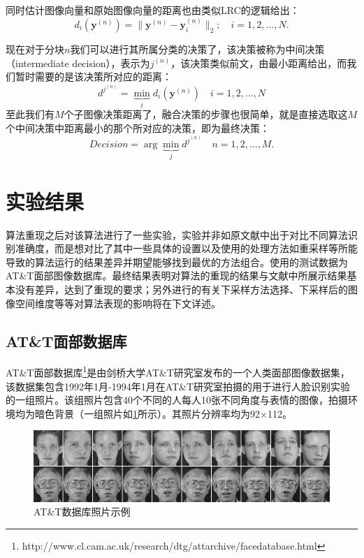 \documentclass[UTF8]{ctexart}
\begin{document}
\par
同时估计图像向量和原始图像向量的距离也由类似LRC的逻辑给出：
\begin{equation}
    d_i(\mathbf{y}^{(n)})=\|\mathbf{y}^{(n)}-\mathbf{y}^{(n)}_i\|_2;\quad i=1,2,\dots,N.
\end{equation}
\par
现在对于分块\(n\)我们可以进行其所属分类的决策了，该决策被称为中间决策（intermediate decision），表示为\(j^{(n)}\)，该决策类似前文，由最小距离给出，而我们暂时需要的是该决策所对应的距离：
\begin{equation}
    d^{j^{(n)}}=\underbrace{\min}_i d_i(\mathbf{y}^{(n)})\quad i=1,2,\dots,N
\end{equation}
至此我们有\(M\)个子图像决策距离了，融合决策的步骤也很简单，就是直接选取这\(M\)个中间决策中距离最小的那个所对应的决策，即为最终决策：
\begin{equation}
    Decision=\arg{\underbrace{\min}_j}d^{j^{(n)}}\quad n=1,2,\dots,M.
\end{equation}
\section{实验结果}\label{sec-3}
算法重现之后对该算法进行了一些实验，实验并非如原文献中出于对比不同算法识别准确度，而是想对比了其中一些具体的设置以及使用的处理方法如重采样等所能导致的算法运行的结果差异并期望能够找到最优的方法组合。使用的测试数据为AT\&T面部图像数据库。最终结果表明对算法的重现的结果与文献中所展示结果基本没有差异，达到了重现的要求；另外进行的有关下采样方法选择、下采样后的图像空间维度等等对算法表现的影响将在下文详述。
\subsection{AT\&T面部数据库}
AT\&T面部数据库\footnote{http://www.cl.cam.ac.uk/research/dtg/attarchive/facedatabase.html}是由剑桥大学AT\&T研究室发布的一个人类面部图像数据集，该数据集包含1992年1月-1994年1月在AT\&T研究室拍摄的用于进行人脸识别实验的一组照片。该组照片包含40个不同的人每人10张不同角度与表情的图像，拍摄环境均为暗色背景（一组照片如\ref{fig-example_ATT}所示）。其照片分辨率均为92\(\times\)112。
\begin{figure}[htbp]
    \centering
    \includegraphics[scale=0.7]{ATT.jpg}
    \caption{AT\&T数据库照片示例}\label{fig-example_ATT}
\end{figure}
\end{document}
